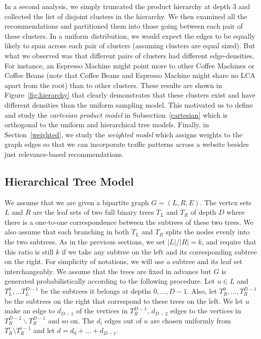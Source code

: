 In a second analysis, we simply truncated the product hierarchy
at depth 3 and collected the list of disjoint clusters in the hierarchy. We
then examined all the recommendations and partitioned them into those going between each pair of these clusters. In a uniform distribution, we would expect the
edges to be equally likely to span across each pair of clusters
(assuming clusters are equal sized). But what we observed was that
different pairs of clusters had different edge-densities. For instance, an Espresso Machine might point more to other Coffee Machines or
Coffee Beans (note that Coffee Beans and Espresso Machine might share
no LCA apart from the root) than to other clusters. These results are
shown in Figure~\ref{fig:hierarchy} that clearly demonstrates that these
clusters exist and have different densities than the uniform sampling model. This
motivated us to define and study the {\em cartesian product model} in
Subsection~\ref{cartesian} which is orthogonal to the uniform and
hierarchical tree models. Finally, in Section~\ref{weighted}, we study the {\em weighted model}
which assigns weights to the graph edges so that we can incorporate traffic
patterns across a website besides just relevance-based recommendations.

\subsection{Hierarchical Tree Model}
\label{hierarchy}

We assume that we are given a bipartite graph $G=(L,R,E)$. The vertex sets $L$
and $R$ are the leaf sets of two full binary trees $T_L$ and $T_R$ of
depth $D$ where there is a one-to-one correspondence between the
subtrees of these two trees. We also assume that each branching in
both $T_L$ and $T_R$ splits the nodes evenly into the two
subtrees. As in the previous sections, we set $|L|/|R|=k$,
and require that this ratio is still $k$ if we take any subtree on the left
and its corresponding subtree on the right. For simplicity of notations, we
will use a subtree and its leaf set interchangeably. We assume that the trees are
fixed in advance but $G$ is generated probabilistically according to
the following procedure. Let $u\in L$ and $T_L^0, \ldots T^{D-1}_L$ be
the subtrees it belongs at depths $0,\ldots, D-1$. Also, let
$T_R^0,\ldots, T_R^{D-1}$ be the subtrees on the right that correspond
to these trees on the left. We let $u$ make an edge to $d_{D-1}$ of
the vertices in $T_{R}^{D-1}$, $d_{D-2}$ edges to the vertices in
$T_{R}^{D-2} \backslash T_{R}^{D-1}$ and so on. The $d_i$ edges out of $u$ are chosen uniformly from $T_R^i \setminus T_R^{i-1}$ 
and let $d = d_{0} + \ldots + d_{D-1}$.\vs


